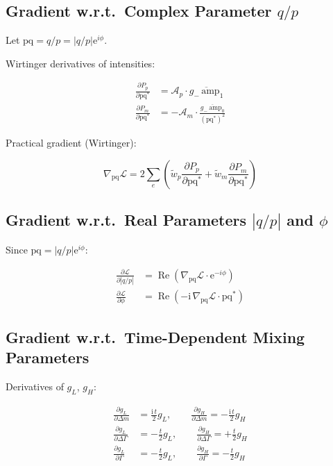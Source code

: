 \documentclass[12pt,a4paper]{article}
\newcommand{\ee}{\mathrm{e}}
\newcommand{\ii}{\mathrm{i}}
\begin{document}
\subsection{Gradient w.r.t.\ Complex Parameter $q/p$}

Let $\text{pq} = q/p = |q/p|\ee^{i\phi}$.

Wirtinger derivatives of intensities:

\begin{align}
\frac{\partial P_p}{\partial \text{pq}^*} &= \mathcal{A}_p \cdot \overline{g_- \, \text{amp}_1} \\
\frac{\partial P_m}{\partial \text{pq}^*} &= -\mathcal{A}_m \cdot \frac{\overline{g_- \, \text{amp}_0}}{(\text{pq}^*)^2}
\end{align}

Practical gradient (Wirtinger):

\begin{equation}
\nabla_{\text{pq}} \mathcal{L} = 2 \sum_e \left( \tilde{w}_p \frac{\partial P_p}{\partial \text{pq}^*} + \tilde{w}_m \frac{\partial P_m}{\partial \text{pq}^*} \right)
\end{equation}

\subsection{Gradient w.r.t.\ Real Parameters $|q/p|$ and $\phi$}

Since $\text{pq} = |q/p| \ee^{i\phi}$:

\begin{align}
\frac{\partial \mathcal{L}}{\partial |q/p|} &= \operatorname{Re}\!\left(\nabla_{\text{pq}} \mathcal{L} \cdot \ee^{-i\phi}\right) \\
\frac{\partial \mathcal{L}}{\partial \phi} &= \operatorname{Re}\!\left(-\ii \, \nabla_{\text{pq}} \mathcal{L} \cdot \text{pq}^*\right)
\end{align}

\subsection{Gradient w.r.t.\ Time-Dependent Mixing Parameters}

Derivatives of $g_L$, $g_H$:

\begin{align}
\frac{\partial g_L}{\partial \Delta m} &= \frac{\ii\, t}{2} g_L, \qquad
\frac{\partial g_H}{\partial \Delta m} = -\frac{\ii\, t}{2} g_H \\
\frac{\partial g_L}{\partial \Delta\Gamma} &= -\frac{t}{2} g_L, \qquad
\frac{\partial g_H}{\partial \Delta\Gamma} = +\frac{t}{2} g_H \\
\frac{\partial g_L}{\partial \Gamma} &= -\frac{t}{2} g_L, \qquad
\frac{\partial g_H}{\partial \Gamma} = -\frac{t}{2} g_H
\end{align}
\end{document}
